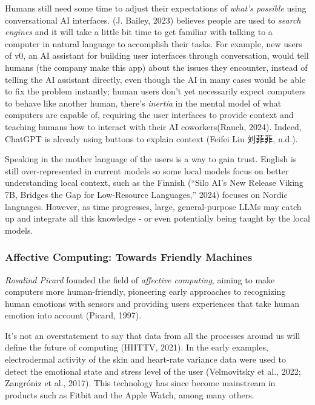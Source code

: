 \documentclass[
  12pt,
  letterpaper,
  DIV=11,
  numbers=noendperiod]{scrartcl}
\begin{document}
Humans still need some time to adjust their expectations of \emph{what's
possible} using conversational AI interfaces. (J. Bailey, 2023) believes
people are used to \emph{search engines} and it will take a little bit
time to get familiar with talking to a computer in natural language to
accomplish their tasks. For example, new users of v0, an AI assistant
for building user interfaces through conversation, would tell humans
(the company make this app) about the issues they encounter, instead of
telling the AI assistant directly, even though the AI in many cases
would be able to fix the problem instantly; human users don't yet
necessarily expect computers to behave like another human, there's
\emph{inertia} in the mental model of what computers are capable of,
requiring the user interfaces to provide context and teaching humans how
to interact with their AI coworkers(Rauch, 2024). Indeed, ChatGPT is
already using buttons to explain context (Feifei Liu 刘菲菲, n.d.).

Speaking in the mother language of the users is a way to gain trust.
English is still over-represented in current models so some local models
focus on better understanding local context, such as the Finnish
({``Silo {AI}'s New Release {Viking 7B}, Bridges the Gap for
Low-Resource Languages,''} 2024) focuses on Nordic languages. However,
as time progresses, large, general-purpose LLMs may catch up and
integrate all this knowledge - or even potentially being taught by the
local models.

\subsubsection{Affective Computing: Towards Friendly
Machines}\label{affective-computing-towards-friendly-machines}

\emph{Rosalind Picard} founded the field of \emph{affective computing},
aiming to make computers more human-friendly, pioneering early
approaches to recognizing human emotions with sensors and providing
users experiences that take human emotion into account (Picard, 1997).

It's not an overstatement to say that data from all the processes around
us will define the future of computing (HIITTV, 2021). In the early
examples, electrodermal activity of the skin and heart-rate variance
data were used to detect the emotional state and stress level of the
user (Velmovitsky et al., 2022; Zangróniz et al., 2017). This technology
has since become mainstream in products such as Fitbit and the Apple
Watch, among many others.
\end{document}
